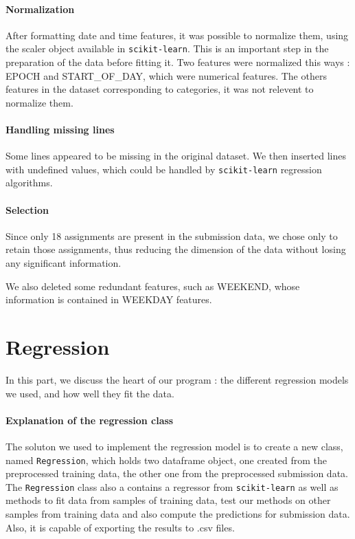 \documentclass[a4paper,10pt]{article}
\begin{document}
    \subsection{Normalization}

    After formatting date and time features, it was possible to normalize them, using the scaler object available in {\tt scikit-learn}. This is an important step in the preparation of the data before fitting it. Two features were normalized this ways : EPOCH and START\_OF\_DAY, which were numerical features. The others features in the dataset corresponding to categories, it was not relevent to normalize them.

    \subsection{Handling missing lines}

    Some lines appeared to be missing in the original dataset. We then inserted lines with undefined values, which could be handled by {\tt scikit-learn} regression algorithms.

    \subsection{Selection}

    Since only 18 assignments are present in the submission data, we chose only to retain those assignments, thus reducing the dimension of the data without losing any significant information.

    We also deleted some redundant features, such as WEEKEND, whose information is contained in WEEKDAY features.

\newpage
\part{Regression}

In this part, we discuss the heart of our program : the different regression models we used, and how well they fit the data.

  \subsection{Explanation of the regression class}

  The soluton we used to implement the regression model is to create a new class, named {\tt Regression}, which holds two dataframe object, one created from the preprocessed training data, the other one from the preprocessed submission data. The {\tt Regression} class also a contains a regressor from {\tt scikit-learn} as well as methods to fit data from samples of training data, test our methods on other samples from training data and also compute the predictions for submission data. Also, it is capable of exporting the results to .csv files.
\end{document}
